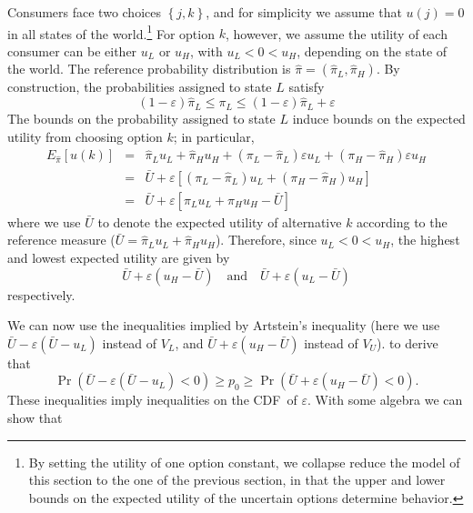 \documentclass[reqno]{article}
\begin{document}
Consumers face two choices $\left\{ j,k\right\} $, and for simplicity we
assume that $u\left( j\right) =0$ in all states of the world.\footnote{%
By setting the utility of one option constant, we collapse reduce the model
of this section to the one of the previous section, in that the upper and
lower bounds on the expected utility of the uncertain options determine
behavior.} For option $k$, however, we assume the utility of each consumer
can be either $u_{L}$ or $u_{H}$, with $u_{L}<0<u_{H}$, depending on the
state of the world. The reference probability distribution is $\hat{\pi}%
=\left( \hat{\pi}_{L},\hat{\pi}_{H}\right) $. By construction, the
probabilities assigned to state $L$ satisfy%
\begin{equation*}
\left( 1-\varepsilon \right) \hat{\pi}_{L}\leq \pi _{L}\leq \left(
1-\varepsilon \right) \hat{\pi}_{L}+\varepsilon
\end{equation*}%
The bounds on the probability assigned to state $L$ induce bounds on the
expected utility from choosing option $k$; in particular,%
\begin{eqnarray*}
E_{\hat{\pi}}\left[ u\left( k\right) \right] &=&\hat{\pi}_{L}u_{L}+\hat{\pi}%
_{H}u_{H}+\left( \pi _{L}-\hat{\pi}_{L}\right) \varepsilon u_{L}+\left( \pi
_{H}-\hat{\pi}_{H}\right) \varepsilon u_{H} \\
&=&\bar{U}+\varepsilon \left[ \left( \pi _{L}-\hat{\pi}_{L}\right)
u_{L}+\left( \pi _{H}-\hat{\pi}_{H}\right) u_{H}\right] \\
&=&\bar{U}+\varepsilon \left[ \pi _{L}u_{L}+\pi _{H}u_{H}-\bar{U}\right]
\end{eqnarray*}%
where we use $\bar{U}$ to denote the expected utility of alternative $k$
according to the reference measure ($\bar{U}=\hat{\pi}_{L}u_{L}+\hat{\pi}%
_{H}u_{H}$). Therefore, since $u_{L}<0<u_{H}$, the highest and lowest
expected utility are given by%
\begin{equation*}
\bar{U}+\varepsilon \left( u_{H}-\bar{U}\right) \quad \text{and}\quad \bar{U}%
+\varepsilon \left( u_{L}-\bar{U}\right)
\end{equation*}%
respectively.

We can now use the inequalities implied by Artstein's inequality (here we
use $\bar{U}-\varepsilon \left( \bar{U}-u_{L}\right) $ instead of $V_{L}$,
and $\bar{U}+\varepsilon \left( u_{H}-\bar{U}\right) $ instead of $V_{U}$).
to derive that 
\begin{equation*}
\Pr \left( \bar{U}-\varepsilon \left( \bar{U}-u_{L}\right) <0\right) \geq
p_{0}\geq \Pr \left( \bar{U}+\varepsilon \left( u_{H}-\bar{U}\right)
<0\right) .
\end{equation*}%
These inequalities imply inequalities on the CDF\ of $\varepsilon $. With
some algebra we can show that
\end{document}

